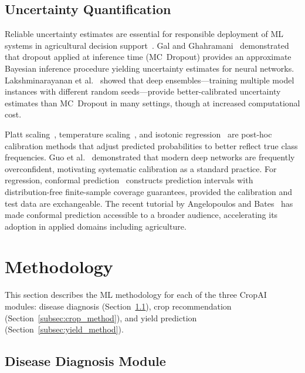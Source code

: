 \documentclass[conference]{IEEEtran}
\begin{document}
\subsection{Uncertainty Quantification}

Reliable uncertainty estimates are essential for responsible deployment of ML systems in agricultural decision support~\cite{abdar2021review}. Gal and Ghahramani~\cite{gal2016dropout} demonstrated that dropout applied at inference time (MC~Dropout) provides an approximate Bayesian inference procedure yielding uncertainty estimates for neural networks. Lakshminarayanan et al.~\cite{lakshminarayanan2017simple} showed that deep ensembles---training multiple model instances with different random seeds---provide better-calibrated uncertainty estimates than MC~Dropout in many settings, though at increased computational cost.

Platt scaling~\cite{platt1999probabilistic}, temperature scaling~\cite{guo2017calibration}, and isotonic regression~\cite{zadrozny2002transforming} are post-hoc calibration methods that adjust predicted probabilities to better reflect true class frequencies. Guo et al.~\cite{guo2017calibration} demonstrated that modern deep networks are frequently overconfident, motivating systematic calibration as a standard practice. For regression, conformal prediction~\cite{vovk2005algorithmic} constructs prediction intervals with distribution-free finite-sample coverage guarantees, provided the calibration and test data are exchangeable. The recent tutorial by Angelopoulos and Bates~\cite{angelopoulos2023conformal} has made conformal prediction accessible to a broader audience, accelerating its adoption in applied domains including agriculture.


\section{Methodology}
\label{sec:methodology}

This section describes the ML methodology for each of the three CropAI modules: disease diagnosis (Section~\ref{subsec:disease_method}), crop recommendation (Section~\ref{subsec:crop_method}), and yield prediction (Section~\ref{subsec:yield_method}).

\subsection{Disease Diagnosis Module}
\label{subsec:disease_method}
\end{document}
